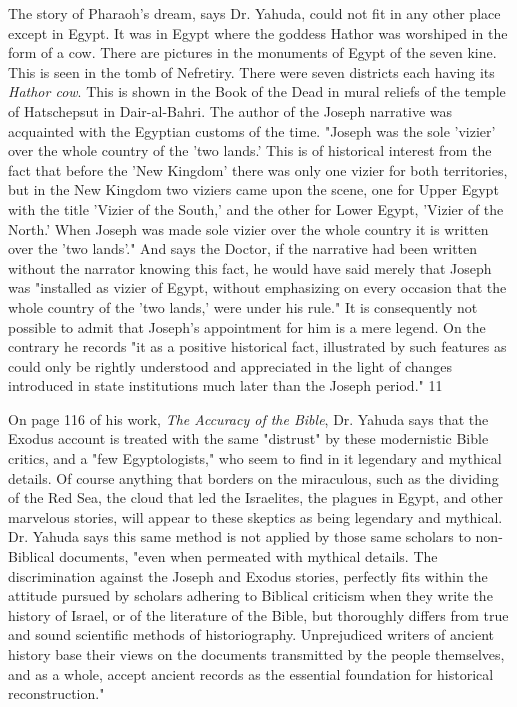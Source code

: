 The story of Pharaoh's dream, says Dr. Yahuda, could not fit in any other place except in
Egypt. It was in Egypt where the goddess Hathor was worshiped in the form of a cow. There
are pictures in the monuments of Egypt of the seven kine. This is seen in the tomb of
Nefretiry. There were seven districts each having its \textit{Hathor cow}. This is shown in the Book
of the Dead in mural reliefs of the temple of Hatschepsut in Dair-al-Bahri. The author of the
Joseph narrative was acquainted with the Egyptian customs of the time. "Joseph was the sole
'vizier' over the whole country of the 'two lands.' This is of historical interest from the fact
that before the 'New Kingdom' there was only one vizier for both territories, but in the New
Kingdom two viziers came upon the scene, one for Upper Egypt with the title 'Vizier of the
South,' and the other for Lower Egypt, 'Vizier of the North.' When Joseph was made sole
vizier over the whole country it is written over the 'two lands'." And says the Doctor, if the
narrative had been written without the narrator knowing this fact, he would have said merely
that Joseph was "installed as vizier of Egypt, without emphasizing on every occasion that the
whole country of the 'two lands,' were under his rule." It is consequently not possible to admit
that Joseph's appointment for him is a mere legend. On the contrary he records "it as a
positive historical fact, illustrated by such features as could only be rightly understood and
appreciated in the light of changes introduced in state institutions much later than the Joseph
period." 11

On page 116 of his work, \textit{The Accuracy of the Bible}, Dr. Yahuda says that the Exodus
account is treated with the same "distrust" by these modernistic Bible critics, and a "few
Egyptologists," who seem to find in it legendary and mythical details. Of course anything
that borders on the miraculous, such as the dividing of the Red Sea, the cloud that led the
Israelites, the plagues in Egypt, and other marvelous stories, will appear to these skeptics as
being legendary and mythical. Dr. Yahuda says this same method is not applied by those
same scholars to non-Biblical documents, "even when permeated with mythical details. The
discrimination against the Joseph and Exodus stories, perfectly fits within the attitude
pursued by scholars adhering to Biblical criticism when they write the history of Israel, or of
the literature of the Bible, but thoroughly differs from true and sound scientific methods of
historiography. Unprejudiced writers of ancient history base their views on the documents
transmitted by the people themselves, and as a whole, accept ancient records as the essential
foundation for historical reconstruction."

